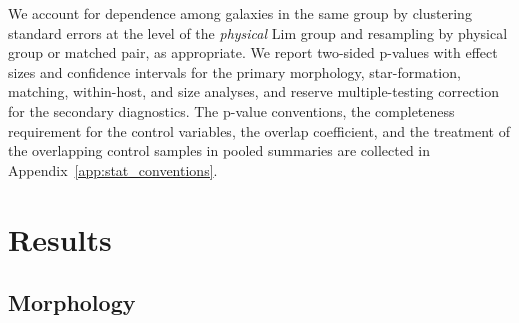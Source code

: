 \documentclass{aa}
\begin{document}
We account for dependence among galaxies in the same group by clustering standard errors at the level of the \emph{physical} Lim group and resampling by physical group or matched pair, as appropriate. We report two-sided p-values with effect sizes and confidence intervals for the primary morphology, star-formation, matching, within-host, and size analyses, and reserve multiple-testing correction for the secondary diagnostics. The p-value conventions, the completeness requirement for the control variables, the overlap coefficient, and the treatment of the overlapping control samples in pooled summaries are collected in Appendix~\ref{app:stat_conventions}.

\section{Results}\label{sec:results}
\subsection{Morphology}\label{sec:morphology}
\end{document}
